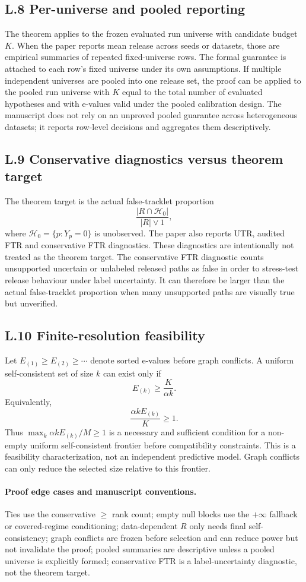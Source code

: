 \documentclass[11pt]{article}
\newcommand{\Hcal}{\mathcal H}
\begin{document}
\subsection*{L.8 Per-universe and pooled reporting}

The theorem applies to the frozen evaluated run universe with candidate budget \(K\).
When the paper reports mean release across seeds or datasets, those are empirical summaries of repeated fixed-universe rows.
The formal guarantee is attached to each row's fixed universe under its own assumptions.
If multiple independent universes are pooled into one release set, the proof can be applied to the pooled run universe with \(K\) equal to the total number of evaluated hypotheses and with e-values valid under the pooled calibration design.
The manuscript does not rely on an unproved pooled guarantee across heterogeneous datasets; it reports row-level decisions and aggregates them descriptively.

\subsection*{L.9 Conservative diagnostics versus theorem target}

The theorem target is the actual false-tracklet proportion
\[
\frac{|R\cap\Hcal_0|}{|R|\vee1},
\]
where \(\Hcal_0=\{p:Y_p=0\}\) is unobserved.
The paper also reports UTR, audited FTR and conservative FTR diagnostics.
These diagnostics are intentionally not treated as the theorem target.
The conservative FTR diagnostic counts unsupported uncertain or unlabeled released paths as false in order to stress-test release behaviour under label uncertainty.
It can therefore be larger than the actual false-tracklet proportion when many unsupported paths are visually true but unverified.

\subsection*{L.10 Finite-resolution feasibility}

Let \(E_{(1)}\ge E_{(2)}\ge\cdots\) denote sorted e-values before graph conflicts.
A uniform self-consistent set of size \(k\) can exist only if
\[
E_{(k)}\ge \frac{K}{\alpha k}.
\]
Equivalently,
\[
\frac{\alpha kE_{(k)}}{K}\ge1.
\]
Thus \(\max_k\alpha kE_{(k)}/M\ge1\) is a necessary and sufficient condition for a non-empty uniform self-consistent frontier before compatibility constraints.
This is a feasibility characterization, not an independent predictive model.
Graph conflicts can only reduce the selected size relative to this frontier.

\paragraph{Proof edge cases and manuscript conventions.}
Ties use the conservative \(\ge\) rank count; empty null blocks use the \(+\infty\) fallback or covered-regime conditioning; data-dependent \(R\) only needs final self-consistency; graph conflicts are frozen before selection and can reduce power but not invalidate the proof; pooled summaries are descriptive unless a pooled universe is explicitly formed; conservative FTR is a label-uncertainty diagnostic, not the theorem target.
\end{document}
